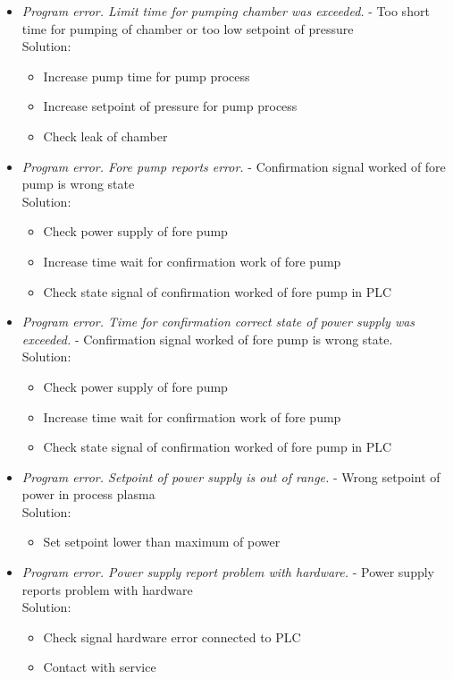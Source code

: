 \begin{itemize}
	\item \textit{Program error. Limit time for pumping chamber was exceeded.} - Too short time for pumping of chamber or too low setpoint of pressure  \\
 		Solution:
		\begin{itemize}
			\item Increase pump time for pump process
			\item  Increase setpoint of pressure for pump process
			\item Check leak of chamber
		\end{itemize}

	\item \textit{Program error. Fore pump reports error.} -  Confirmation signal worked of fore pump is wrong state\\
 		Solution:
		\begin{itemize}
			\item Check power supply of fore pump 
			\item Increase time wait for confirmation work of fore pump  
			\item Check state signal of confirmation worked of fore pump in PLC
		\end{itemize}

	\item \textit{Program error. Time for confirmation correct state of power supply was exceeded.} - Confirmation signal worked of fore pump is wrong state.\\
 		Solution:
		\begin{itemize}
			\item Check power supply of fore pump 
			\item Increase time wait for confirmation work of fore pump  
			\item Check state signal of confirmation worked of fore pump in PLC
		\end{itemize}

	\item \textit{Program error. Setpoint of power supply is out of range.}  - Wrong setpoint of power in process plasma \\
 		Solution:
		\begin{itemize}
			\item Set setpoint lower than maximum of power
		\end{itemize}

	\item \textit{Program error. Power supply report problem with hardware.}  - Power supply reports problem with hardware \\
 		Solution:
		\begin{itemize}
			\item Check signal hardware error connected to PLC 
			\item Contact with service
		\end{itemize}


\end{itemize}
